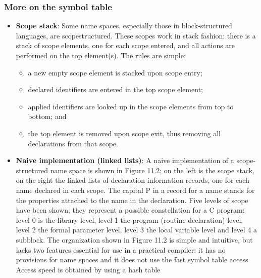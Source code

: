\documentclass{report}
\begin{document}
        \subsubsection{More on the symbol table}
        \begin{itemize}
            \item \textbf{Scope stack}: Some name spaces, especially those in block-structured languages, are scopestructured. These scopes work in stack fashion: there is a stack of scope elements, one for each scope entered, and all actions are performed on the top element(s). The rules are simple:
                \begin{itemize}
                    \item a new empty scope element is stacked upon scope entry;
                    \item declared identifiers are entered in the top scope element;
                    \item applied identifiers are looked up in the scope elements from top to bottom; and
                    \item the top element is removed upon scope exit, thus removing all declarations from that scope.
                \end{itemize}
            \item \textbf{Naive implementation (linked lists)}: 
                A naive implementation of a scope-structured name space is shown in Figure 11.2; on the left is the scope stack, on the right the linked lists of declaration information records, one for each name declared in each scope. The capital P in a record for a name stands for the properties attached to the name in the declaration.
                \bigbreak \noindent 
                Five levels of scope have been shown; they represent a possible constellation for a C program: level 0 is the library level, level 1 the program (routine declaration) level, level 2 the formal parameter level, level 3 the local variable level and level 4 a subblock.
                \bigbreak \noindent 
                \bigbreak \noindent 
                The organization shown in Figure 11.2 is simple and intuitive, but lacks two features essential for use in a practical compiler: it has no provisions for name spaces and it does not use the fast symbol table access
                \bigbreak \noindent 
                Access speed is obtained by using a hash table
                \bigbreak \noindent 

\end{itemize}
\end{document}
